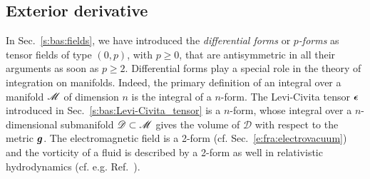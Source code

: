 \subsection{Exterior derivative} \label{s:bas:ext_deriv}

In Sec.~\ref{s:bas:fields}, we have introduced the
\emph{differential forms}
or \emph{$p$-forms}
as tensor fields of type $(0,p)$, with $p\ge 0$,
that are antisymmetric in all their arguments as soon as $p\ge 2$.
Differential forms play a special role in the theory of integration on
manifolds. Indeed, the primary definition of an integral over a manifold $\mathscr{M}$ of
dimension $n$ is the integral of a $n$-form.
The Levi-Civita tensor $\bm{\epsilon}$
introduced in Sec.~\ref{s:bas:Levi-Civita_tensor} is a $n$-form, whose integral
over a $n$-dimensional submanifold $\mathscr{D}\subset\mathscr{M}$ gives the volume of $\mathscr{D}$
with respect to the metric $\bm{g}$.
The electromagnetic field is a 2-form (cf. Sec.~\ref{e:fra:electrovacuum})
and the vorticity of a fluid is described by a 2-form as well
in relativistic hydrodynamics (cf. e.g. Ref.~\cite{Gourg13}).

